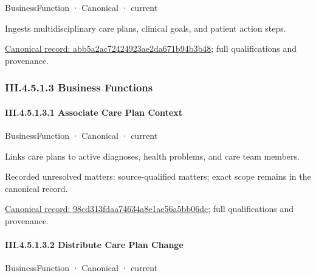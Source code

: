 \label{element:abb5a2ac72424923ae2da671b94b3b48}
{\small BusinessFunction · Canonical · current}\par

Ingests multidisciplinary care plans, clinical goals, and patient action steps.


{\footnotesize \href{../../../../../../../continuum/business/business-function/abb5a2ac72424923ae2da671b94b3b48.md}{Canonical record: abb5a2ac72424923ae2da671b94b3b48}; full qualifications and provenance.}\par
\subsubsection*{III.4.5.1.3 Business Functions}
\label{navigation:III.4.5.1.3}

\paragraph*{III.4.5.1.3.1 Associate Care Plan Context}
\label{navigation:III.4.5.1.3.1}

\label{element:98cd313fdaa74634a8e1ae56a5bb06dc}
{\small BusinessFunction · Canonical · current}\par

Links care plans to active diagnoses, health problems, and care team members.


{\small Recorded unresolved matters: source-qualified matters; exact scope remains in the canonical record.}\par
{\footnotesize \href{../../../../../../../continuum/business/business-function/98cd313fdaa74634a8e1ae56a5bb06dc.md}{Canonical record: 98cd313fdaa74634a8e1ae56a5bb06dc}; full qualifications and provenance.}\par
\paragraph*{III.4.5.1.3.2 Distribute Care Plan Change}
\label{navigation:III.4.5.1.3.2}

\label{element:cbfa51308103418a9dffe23a2d8cfd87}
{\small BusinessFunction · Canonical · current}\par

